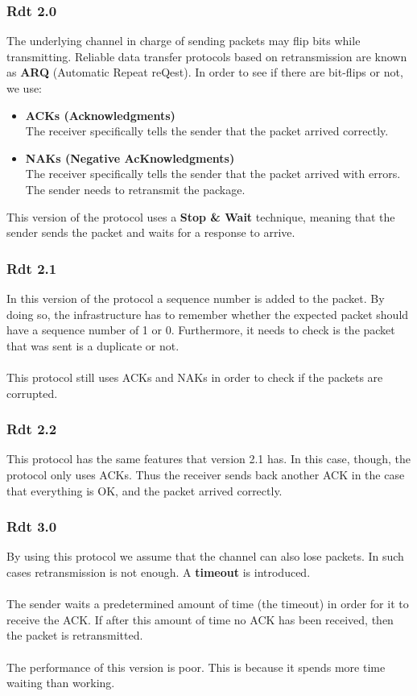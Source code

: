 \documentclass{article}
\begin{document}
\subsubsection{Rdt 2.0}
The underlying channel in charge of sending packets may flip bits while transmitting. Reliable data transfer protocols based on retransmission are known as \textbf{ARQ} (Automatic Repeat reQest). In order to see if there are bit-flips or not, we use:

\begin{itemize}
	\item \textbf{ACKs (Acknowledgments)}
	\vspace{.2cm} \\
	The receiver specifically tells the sender that the packet arrived correctly.
	
	\item \textbf{NAKs (Negative AcKnowledgments)}
	\vspace{.2cm} \\
	The receiver specifically tells the sender that the packet arrived with errors. The sender needs to retransmit the package.
\end{itemize}
This version of the protocol uses a \textbf{Stop \& Wait} technique, meaning that the sender sends the packet and waits for a response to arrive.

\subsubsection{Rdt 2.1}
In this version of the protocol a sequence number is added to the packet. By doing so, the infrastructure has to remember whether the expected packet should have a sequence number of 1 or 0. Furthermore, it needs to check is the packet that was sent is a duplicate or not.  \\ \\
This protocol still uses ACKs and NAKs in order to check if the packets are corrupted.

\subsubsection{Rdt 2.2}
This protocol has the same features that version 2.1 has. In this case, though, the protocol only uses ACKs. Thus the receiver sends back another ACK in the case that everything is OK, and the packet arrived correctly.

\subsubsection{Rdt 3.0}
By using this protocol we assume that the channel can also lose packets. In such cases retransmission is not enough. A \textbf{timeout} is introduced. \\ \\
The sender waits a predetermined amount of time (the timeout) in order for it to receive the ACK. If after this amount of time no ACK has been received, then the packet is retransmitted. \\ \\ 
The performance of this version is poor. This is because it spends more time waiting than working.
\end{document}
